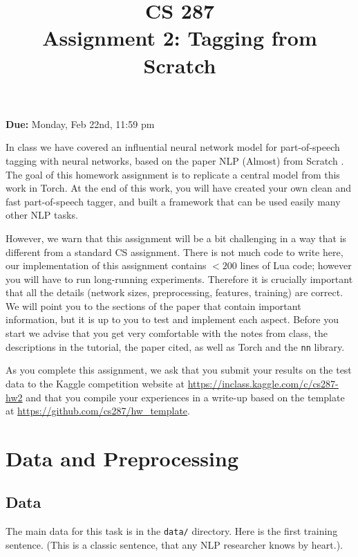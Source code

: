 \documentclass[11pt]{article}
\title{CS 287 \\ Assignment 2: Tagging from Scratch }
\date{}
\begin{document}
\maketitle{}

\begin{center}
  \textbf{Due:} Monday, Feb 22nd, 11:59 pm 
\end{center}


In class we have covered an influential neural network model for
part-of-speech tagging with neural networks, based on the paper NLP
(Almost) from Scratch \cite{collobert2011natural}. The goal of this
homework assignment is to replicate a central model from this work in
Torch. At the end of this work, you will have created your own clean
and fast part-of-speech tagger, and built a framework that can be used
easily many other NLP tasks.

However, we warn that this assignment will be a bit challenging in a
way that is different from a standard CS assignment. There is not much
code to write here, our implementation of this assignment contains
$<200$ lines of Lua code; however you will have to run long-running
experiments. Therefore it is crucially important that all the details
(network sizes, preprocessing, features, training) are correct.  We
will point you to the sections of the paper that contain important
information, but it is up to you to test and implement each aspect.
Before you start we advise that you get very comfortable with the
notes from class, the descriptions in the tutorial, the paper cited,
as well as Torch and the \texttt{nn} library.


As you complete this assignment, we ask that you submit your results
on the test data to the Kaggle competition website at
\url{https://inclass.kaggle.com/c/cs287-hw2} and that you compile your
experiences in a write-up based on the template at
\url{https://github.com/cs287/hw_template}.

\section{Data and Preprocessing}

\subsection{Data}

The main data for this task is in
the \texttt{data/} directory. Here
is the first training
sentence. (This is a classic
sentence, that any NLP researcher
knows by heart.).
\end{document}
